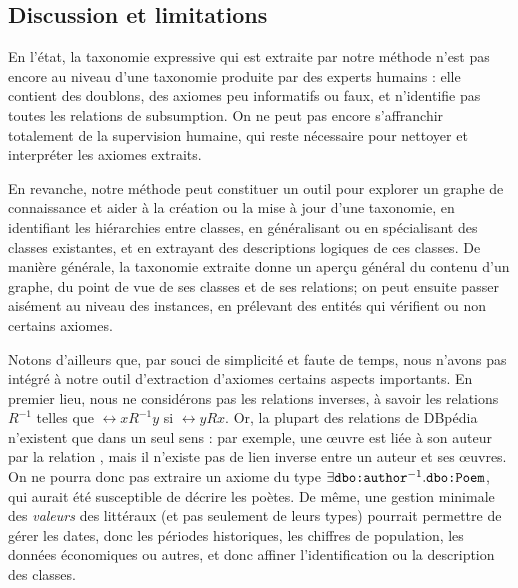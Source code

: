 \subsection{Discussion et limitations}
\label{subsec:texp-reslts-limits}

En l'état, la taxonomie expressive qui est extraite par notre méthode n'est pas encore au niveau d'une taxonomie produite par des experts humains : elle contient des doublons, des axiomes peu informatifs ou faux, et n'identifie pas toutes les relations de subsumption. On ne peut pas encore s'affranchir totalement de la supervision humaine, qui reste nécessaire pour nettoyer et interpréter les axiomes extraits. 

En revanche, notre méthode peut constituer un outil pour explorer un graphe de connaissance et aider à la création ou la mise à jour d'une taxonomie, en identifiant les hiérarchies entre classes, en généralisant ou en spécialisant des classes existantes, et en extrayant des descriptions logiques de ces classes. 
De manière générale, la taxonomie extraite donne un aperçu général du contenu d'un graphe, du point de vue de ses classes et de ses relations; on peut ensuite passer aisément au niveau des instances, en prélevant des entités qui vérifient ou non certains axiomes.

Notons d'ailleurs que, par souci de simplicité et faute de temps, nous n'avons pas intégré à notre outil d'extraction d'axiomes certains aspects importants.
En premier lieu, nous ne considérons pas les relations inverses, à savoir les relations $R^{-1}$ telles que $\rel{x}{R^{-1}}{y}$ si $\rel{y}{R}{x}$. 
Or, la plupart des relations de DBpédia n'existent que dans un seul sens : par exemple, une œuvre est liée à son auteur par la relation , mais il n'existe pas de lien inverse entre un auteur et ses œuvres. On ne pourra donc pas extraire un axiome du type $\exists \texttt{dbo:author}^{-1}. \allowbreak \texttt{dbo:Poem}$, qui aurait été susceptible de décrire les poètes. De même, une gestion minimale des \textit{valeurs} des littéraux (et pas seulement de leurs types) pourrait permettre de gérer les dates, donc les périodes historiques, les chiffres de population, les données économiques ou autres, et donc affiner l'identification ou la description des classes.
